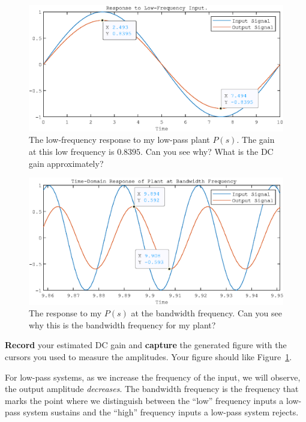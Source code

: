 \begin{figure}
  \includegraphics{images/Lab_1_LowFrequency.eps}
  \caption{The low-frequency response to my low-pass plant \(P(s).\) The gain
  at this low frequency is \(0.8395.\) Can you see why? What is the DC
  gain approximately?}
  \label{fig:lab1:lowfreq}
\end{figure}
%
\begin{figure}
  \includegraphics{images/Lab_1_Bandwidth.eps}
  \caption{The response to my \(P(s)\) at the bandwidth frequency.
  Can you see why this is the bandwidth frequency for my plant?}
  \label{fig:lab1:bandwidth}
\end{figure}
%
\begin{deliverable}
  \textbf{Record} your estimated DC gain and \textbf{capture} the generated
  figure with the cursors you used to measure the amplitudes.
  Your figure should like Figure~\ref{fig:lab1:lowfreq}.
  \label{lab1:d1}
\end{deliverable}
%
For low-pass systems, as we increase the frequency of the input, we will
observe, the output amplitude \emph{decreases}. The bandwidth frequency
is the frequency that marks the point where we distinguish between the
``low'' frequency inputs a low-pass system sustains and the ``high'' frequency
inputs a low-pass system rejects.
